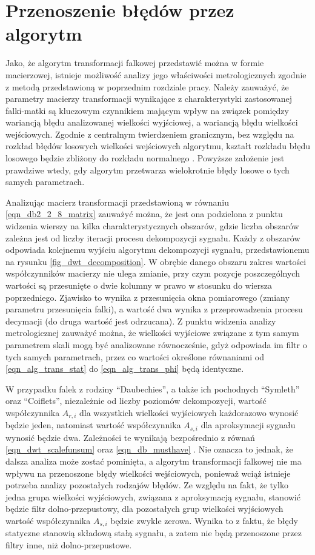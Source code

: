 \section{Przenoszenie błędów przez algorytm}

Jako, że algorytm transformacji falkowej przedstawić można w formie macierzowej, istnieje możliwość analizy jego właściwości metrologicznych zgodnie z metodą przedstawioną w poprzednim rozdziale pracy. Należy zauważyć, że parametry macierzy transformacji wynikające z charakterystyki zastosowanej falki-matki są kluczowym czynnikiem mającym wpływ na związek pomiędzy wariancją błędu analizowanej wielkości wyjściowej, a wariancją błędu wielkości wejściowych. Zgodnie z centralnym twierdzeniem granicznym, bez względu na rozkład błędów losowych wielkości wejściowych algorytmu, kształt rozkładu błędu losowego będzie zbliżony do rozkładu normalnego \cite{jcgm_guide}. Powyższe założenie jest prawdziwe wtedy, gdy algorytm przetwarza wielokrotnie błędy losowe o tych samych parametrach.

Analizując macierz transformacji przedstawioną w równaniu \eqref{eqn_db2_2_8_matrix} zauważyć można, że jest ona podzielona z punktu widzenia wierszy na kilka charakterystycznych obszarów, gdzie liczba obszarów zależna jest od liczby iteracji procesu dekompozycji sygnału. Każdy z obszarów odpowiada kolejnemu wyjściu algorytmu dekompozycji sygnału, przedstawionemu na rysunku \ref{fig_dwt_decomposition}. W obrębie danego obszaru zakres wartości współczynników macierzy nie ulega zmianie, przy czym pozycje poszczególnych wartości są przesunięte o dwie kolumny w prawo w stosunku do wiersza poprzedniego. Zjawisko to wynika z przesunięcia okna pomiarowego (zmiany parametru przesunięcia falki), a wartość dwa wynika z przeprowadzenia procesu decymacji (do druga wartość jest odrzucana). Z punktu widzenia analizy metrologicznej zauważyć można, że wielkości wyjściowe związane z tym samym parametrem skali mogą być analizowane równocześnie, gdyż odpowiada im filtr o tych samych parametrach, przez co wartości określone równaniami od \eqref{eqn_alg_trans_stat} do \eqref{eqn_alg_trans_phi} będą identyczne.

W przypadku falek z rodziny \enquote{Daubechies}, a także ich pochodnych \enquote{Symleth} oraz \enquote{Coiflets}, niezależnie od liczby poziomów dekompozycji, wartość współczynnika $A_{r,i}$ dla wszystkich wielkości wyjściowych każdorazowo wynosić będzie jeden, natomiast wartość współczynnika $A_{s,i}$ dla aproksymacji sygnału wynosić będzie dwa. Zależności te wynikają bezpośrednio z równań \eqref{eqn_dwt_scalefunsum} oraz \eqref{eqn_db_musthave} \cite{vonesch_dbbasics, wei_coiflet}. Nie oznacza to jednak, że dalsza analiza może zostać pominięta, a algorytm transformacji falkowej nie ma wpływu na przenoszone błędy wielkości wejściowych, ponieważ wciąż istnieje potrzeba analizy pozostałych rodzajów błędów. Ze względu na fakt, że tylko jedna grupa wielkości wyjściowych, związana z aproksymacją sygnału, stanowić będzie filtr dolno-przepustowy, dla pozostałych grup wielkości wyjściowych wartość współczynnika $A_{s,i}$ będzie zwykle zerowa. Wynika to z faktu, że błędy statyczne stanowią składową stałą sygnału, a zatem nie będą przenoszone przez filtry inne, niż dolno-przepustowe.

